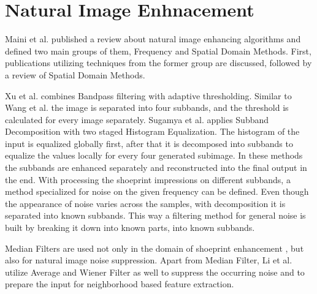 \documentclass[draft,final]{vutinfth} %
\begin{document}


\section*{Natural Image Enhnacement}
\par
Maini et al. \cite{maini2010comprehensive} published a review about natural image enhancing algorithms and defined two main groups of them, Frequency and Spatial Domain Methods.
First, publications utilizing techniques from the former group are discussed, followed by a review of Spatial Domain Methods. 
\par
Xu et al. \cite{xu2016image} combines Bandpass filtering with adaptive thresholding.
Similar to Wang et al. \cite{wang2014enhanced} the image is separated into four subbands, and the threshold is calculated for every image separately.
Sugamya et al. \cite{sugamya2016image} applies Subband Decomposition with two staged Histogram Equalization.
The histogram of the input is equalized globally first, after that it is decomposed into subbands to equalize the values locally for every four generated subimage.
In these methods the subbands are enhanced separately and reconstructed into the final output in the end.
With processing the shoeprint impressions on different subbands, a method specialized for noise on the given frequency can be defined.
Even though the appearance of noise varies across the samples, with decomposition it is separated into known subbands.
This way a filtering method for general noise is built by breaking it down into known parts, into known subbands.  
\par
Median Filters are used not only in the domain of shoeprint enhancement \cite{alizadeh2017automatic}, but also for natural image noise suppression.
Apart from Median Filter, Li et al. \cite{li2014rapid} utilize Average and Wiener Filter as well to suppress the occurring noise and to prepare the input for neighborhood based feature extraction.
\end{document}
